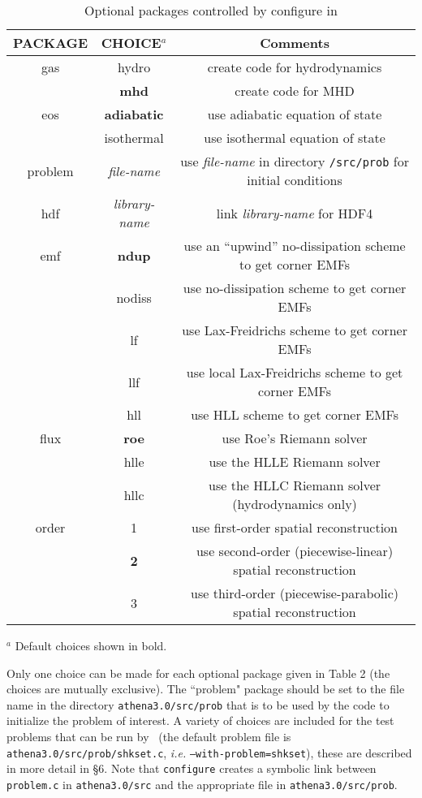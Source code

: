 \begin{table}[ht]
\caption{Optional packages controlled by configure in \ath}
\begin{tabular}{|c|c|c|} \hline \hline
PACKAGE & CHOICE$^{a}$ & Comments \\ \hline
gas    & hydro  & create code for hydrodynamics \\
       & {\bf mhd}    & create code for MHD \\ \hline
eos    & {\bf adiabatic} & use adiabatic equation of state \\
       & isothermal & use isothermal equation of state \\ \hline
problem & {\it file-name} & use {\it file-name} in directory {\tt /src/prob} for initial conditions \\ \hline
hdf & {\it library-name} & link {\it library-name} for HDF4 \\ \hline
emf & {\bf ndup} & use an ``upwind'' no-dissipation scheme to get corner EMFs \\
     & nodiss & use no-dissipation scheme to get corner EMFs \\
     & lf & use Lax-Freidrichs scheme to get corner EMFs \\
     & llf & use local Lax-Freidrichs scheme to get corner EMFs \\
     & hll & use HLL scheme to get corner EMFs\\ \hline
flux & {\bf roe} & use Roe's Riemann solver \\
     & hlle & use the HLLE Riemann solver \\
     & hllc & use the HLLC Riemann solver (hydrodynamics only) \\ \hline
order & 1 & use first-order spatial reconstruction \\
      & {\bf 2} & use second-order (piecewise-linear) spatial reconstruction \\
      & 3 & use third-order (piecewise-parabolic) spatial reconstruction 
\\ \hline
\end{tabular}
$^{a}$ Default choices shown in bold.
\end{table}

Only one choice can be made for each optional package given in Table 2
(the choices are mutually exclusive).  The ``problem" package should
be set to the file name in the directory {\tt athena3.0/src/prob} that
is to be used by the code to initialize the problem of interest.  A
variety of choices are included for the test problems that can be run
by \ath\ (the default problem file is {\tt
athena3.0/src/prob/shkset.c}, {\it i.e.} {\tt --with-problem=shkset}), these are
described in more detail in \S 6.  Note that {\tt configure} creates a
symbolic link between {\tt problem.c} in {\tt athena3.0/src} and the
appropriate file in {\tt athena3.0/src/prob}.

